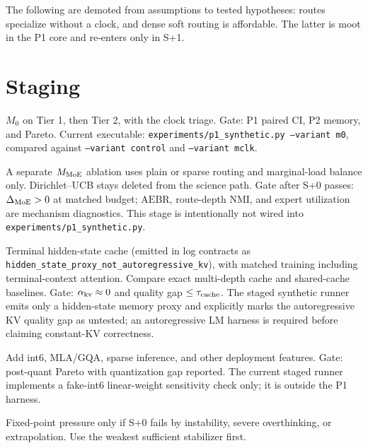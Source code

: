 \documentclass[11pt]{article}
\newcommand{\code}[1]{\texttt{#1}}
\begin{document}
The following are demoted from assumptions to tested hypotheses: routes specialize without a clock,
and dense soft routing is affordable.  The latter is moot in the P1 core and re-enters only in S+1.

\section{Staging}
\label{sec:staging}

\begin{description}[leftmargin=2.2em,itemsep=2pt]
  \item[S+0.] \(M_0\) on Tier 1, then Tier 2, with the clock triage.  Gate: P1 paired CI, P2 memory,
  and Pareto.  Current executable: \code{experiments/p1\_synthetic.py --variant m0}, compared
  against \code{--variant control} and \code{--variant mclk}.
  \item[S+1, P3.] A separate \(M_{\rm MoE}\) ablation uses plain or sparse routing and
  marginal-load balance only.  Dirichlet--UCB stays deleted from the science path.  Gate after S+0
  passes: \(\Delta_{\rm MoE}>0\) at matched budget; \(\mathrm{AEBR}\), route-depth NMI, and expert
  utilization are mechanism diagnostics.  This stage is intentionally not wired into
  \code{experiments/p1\_synthetic.py}.
  \item[S+2, KV axis.] Terminal hidden-state cache (emitted in log contracts as
  \code{hidden\_state\_proxy\_not\_autoregressive\_kv}), with matched training including
  terminal-context attention.  Compare exact multi-depth cache and shared-cache baselines.  Gate:
  \(\alpha_{\rm kv}\approx0\) and quality gap \(\le\tau_{\rm cache}\).  The staged synthetic runner
  emits only a hidden-state memory proxy and explicitly marks the autoregressive KV quality gap as
  untested; an autoregressive LM harness is required before claiming constant-KV correctness.
  \item[S+3, deployment.] Add int6, MLA/GQA, sparse inference, and other deployment features.
  Gate: post-quant Pareto with quantization gap reported.  The current staged runner implements a
  fake-int6 linear-weight sensitivity check only; it is outside the P1 harness.
  \item[Fallback.] Fixed-point pressure only if S+0 fails by instability, severe overthinking, or
  extrapolation.  Use the weakest sufficient stabilizer first.
\end{description}
\end{document}
